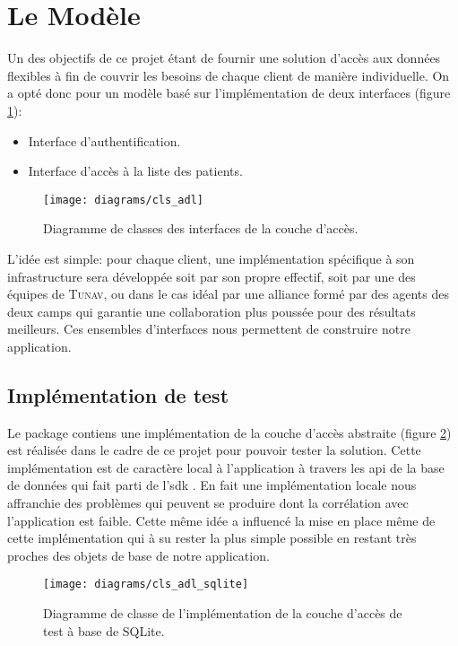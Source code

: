 \section{Le Modèle} 

Un des objectifs de ce projet étant de fournir une solution d’accès aux
données flexibles à fin de couvrir les besoins de chaque client de
manière individuelle. On a opté donc pour un modèle basé sur
l’implémentation de deux interfaces (figure \ref{fig:adl}):

\begin{itemize}
\item Interface d'authentification.
\item Interface d’accès à la liste des patients.
\end{itemize}

\begin{figure}
\center
\texttt{[image: diagrams/cls\_adl]}
\caption{Diagramme de classes des interfaces de la couche d’accès.}
\label{fig:adl}
\end{figure}

L'idée est simple: pour chaque client, une implémentation spécifique à son infrastructure sera développée soit par son propre effectif, soit par une des équipes de \textsc{Tunav}, ou dans le cas idéal par une alliance formé par des agents des deux camps qui garantie une collaboration plus poussée pour des résultats meilleurs.
Ces ensembles d'interfaces nous permettent de construire notre application.

\subsection{Implémentation de test} 

Le package  contiens une
implémentation de la couche d’accès abstraite (figure
\ref{fig:adl_sqlite}) est réalisée dans le cadre de ce projet pour
pouvoir tester la solution. Cette implémentation est de caractère local
à l'application à travers les \gls{api} de la base de données
 qui fait parti de l'\gls{sdk} \android{}. En fait une
implémentation locale nous affranchie des problèmes qui peuvent se
produire dont la corrélation avec l'application est faible. Cette même
idée a influencé la mise en place même de cette implémentation qui à su
rester la plus simple possible en restant très proches des objets de
base de notre application.

\begin{figure}
\center
\texttt{[image: diagrams/cls\_adl\_sqlite]}
\caption{Diagramme de classe de l'implémentation de la couche d'accès de test à base de SQLite.}
\label{fig:adl_sqlite}
\end{figure}

